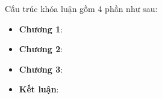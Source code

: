 

Cấu trúc khóa luận gồm 4 phần như sau:
\begin{itemize}
  \item \textbf{Chương 1}: 

  \item \textbf{Chương 2}: 

  \item \textbf{Chương 3}: 

  \item \textbf{Kết luận}: 
\end{itemize}



